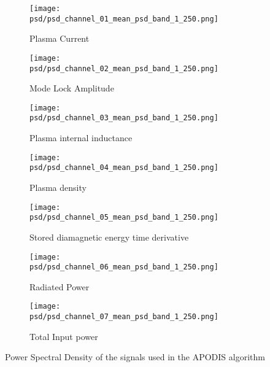 \begin{figure}[htbp]
  \begin{subfigure}{.5\textwidth}
    \centering
    \texttt{[image: psd/psd\_channel\_01\_mean\_psd\_band\_1\_250.png]}
    \caption{Plasma Current}
    \label{fig:psd_channel_01_mean_psd_band_1_250}
  \end{subfigure}
  \begin{subfigure}{.5\textwidth}
    \centering
    \texttt{[image: psd/psd\_channel\_02\_mean\_psd\_band\_1\_250.png]}
    \caption{Mode Lock Amplitude}
    \label{fig:psd_channel_02_mean_psd_band_1_250}
  \end{subfigure}
  \begin{subfigure}{.5\textwidth}
    \centering
    \texttt{[image: psd/psd\_channel\_03\_mean\_psd\_band\_1\_250.png]}
    \caption{Plasma internal inductance}
    \label{fig:psd_channel_03_mean_psd_band_1_250}
  \end{subfigure}
  \begin{subfigure}{.5\textwidth}
    \centering
    \texttt{[image: psd/psd\_channel\_04\_mean\_psd\_band\_1\_250.png]}
    \caption{Plasma density}
    \label{fig:psd_channel_04_mean_psd_band_1_250}
  \end{subfigure}
  \begin{subfigure}{.5\textwidth}
    \centering
    \texttt{[image: psd/psd\_channel\_05\_mean\_psd\_band\_1\_250.png]}
    \caption{Stored diamagnetic energy time derivative}
    \label{fig:psd_channel_05_mean_psd_band_1_250}
  \end{subfigure}
  \begin{subfigure}{.5\textwidth}
    \centering
    \texttt{[image: psd/psd\_channel\_06\_mean\_psd\_band\_1\_250.png]}
    \caption{Radiated Power}
    \label{fig:psd_channel_06_mean_psd_band_1_250}
  \end{subfigure}
  \begin{subfigure}{\textwidth}
    \centering
    \texttt{[image: psd/psd\_channel\_07\_mean\_psd\_band\_1\_250.png]}
    \caption{Total Input power}
    \label{fig:psd_channel_07_mean_psd_band_1_250}
  \end{subfigure}
  \caption{Power Spectral Density of the signals used in the \ac{APODIS} algorithm}
  \label{fig:psd}
\end{figure}

